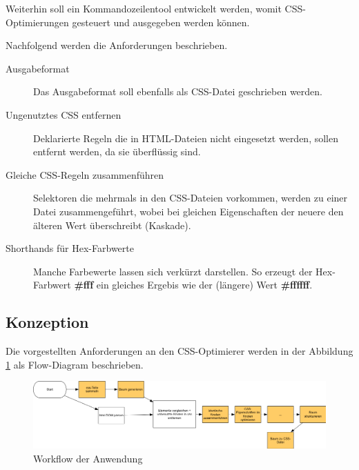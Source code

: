 Weiterhin soll ein Kommandozeilentool entwickelt werden, womit CSS-Optimierungen gesteuert und ausgegeben werden können. 

Nachfolgend werden die Anforderungen beschrieben.

\begin{description}
    \item[Ausgabeformat] Das Ausgabeformat soll ebenfalls als CSS-Datei geschrieben werden.
    
    \item[Ungenutztes CSS entfernen] Deklarierte Regeln die in HTML-Dateien nicht eingesetzt werden, sollen entfernt werden, da sie überflüssig sind.
    
    \item[Gleiche CSS-Regeln zusammenführen] Selektoren die mehrmals in den CSS-Dateien vorkommen, werden zu einer Datei zusammengeführt, wobei bei gleichen Eigenschaften der neuere den älteren Wert überschreibt (Kaskade).
    
    \item[Shorthands für Hex-Farbwerte] Manche Farbewerte lassen sich verkürzt darstellen. So erzeugt der Hex-Farbwert \textbf{\#fff} ein gleiches Ergebis wie der (längere) Wert \textbf{\#ffffff}. 
    
    \item[]
\end{description}

\subsection{Konzeption}

Die vorgestellten Anforderungen an den CSS-Optimierer werden in der Abbildung \ref{app-workflow} als Flow-Diagram beschrieben. 

\begin{figure}[h!]
	\begin{center}
		\includegraphics[width=1.0\textwidth]{img/app-workflow.png}
		\caption{Workflow der Anwendung}
		\label{app-workflow}	
	\end{center}
\end{figure}